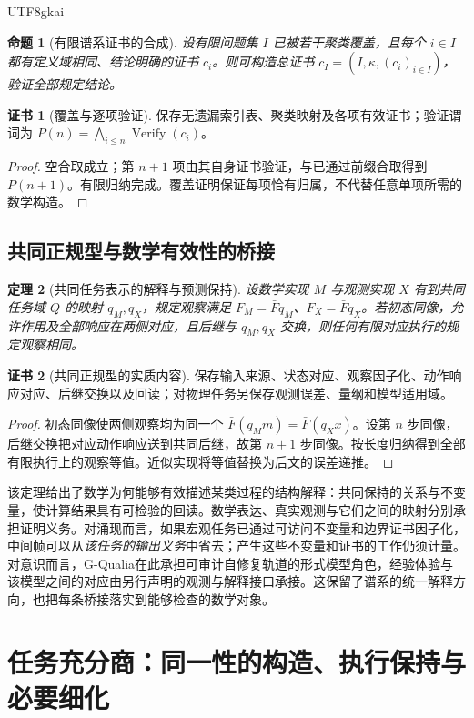 \documentclass[11pt,a4paper]{article}
\theoremstyle{plain}
\newtheorem{theorem}{定理}[section]
\newtheorem{proposition}[theorem]{命题}
\theoremstyle{definition}
\newtheorem*{certificate}{证书}
\theoremstyle{remark}
\begin{document}
\begin{CJK*}{UTF8}{gkai}
\begin{proposition}[有限谱系证书的合成]
设有限问题集 $I$ 已被若干聚类覆盖，且每个 $i\in I$ 都有定义域相同、结论明确的证书 $c_i$。则可构造总证书 $c_I=(I,\kappa,(c_i)_{i\in I})$，验证全部规定结论。
\end{proposition}
\begin{certificate}[覆盖与逐项验证]
保存无遗漏索引表、聚类映射及各项有效证书；验证谓词为 $P(n)=\bigwedge_{i\le n}\operatorname{Verify}(c_i)$。
\end{certificate}
\begin{proof}
空合取成立；第 $n+1$ 项由其自身证书验证，与已通过前缀合取得到 $P(n+1)$。有限归纳完成。覆盖证明保证每项恰有归属，不代替任意单项所需的数学构造。
\end{proof}

\subsection{共同正规型与数学有效性的桥接}

\begin{theorem}[共同任务表示的解释与预测保持]
\label{pc:wigner}
设数学实现 $M$ 与观测实现 $X$ 有到共同任务域 $Q$ 的映射 $q_M,q_X$，规定观察满足 $F_M=\bar Fq_M$、$F_X=\bar Fq_X$。若初态同像，允许作用及全部响应在两侧对应，且后继与 $q_M,q_X$ 交换，则任何有限对应执行的规定观察相同。
\end{theorem}
\begin{certificate}[共同正规型的实质内容]
保存输入来源、状态对应、观察因子化、动作响应对应、后继交换以及回读；对物理任务另保存观测误差、量纲和模型适用域。
\end{certificate}
\begin{proof}
初态同像使两侧观察均为同一个 $\bar F(q_Mm)=\bar F(q_Xx)$。设第 $n$ 步同像，后继交换把对应动作响应送到共同后继，故第 $n+1$ 步同像。按长度归纳得到全部有限执行上的观察等值。近似实现将等值替换为后文的误差递推。
\end{proof}

该定理给出了数学为何能够有效描述某类过程的结构解释：共同保持的关系与不变量，使计算结果具有可检验的回读。数学表达、真实观测与它们之间的映射分别承担证明义务。对涌现而言，如果宏观任务已通过可访问不变量和边界证书因子化，中间帧可以从\emph{该任务的输出义务}中省去；产生这些不变量和证书的工作仍须计量。对意识而言，G-Qualia在此承担可审计自修复轨道的形式模型角色，经验体验与该模型之间的对应由另行声明的观测与解释接口承接。这保留了谱系的统一解释方向，也把每条桥接落实到能够检查的数学对象。

\section{任务充分商：同一性的构造、执行保持与必要细化}
\label{pc:quotient}


\end{CJK*}
\end{document}
